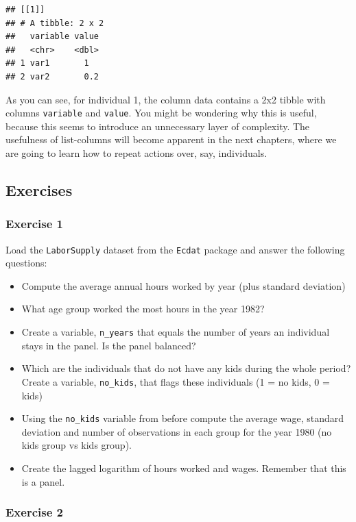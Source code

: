 \documentclass[]{gitbook}
\providecommand{\tightlist}{%
  \setlength{\itemsep}{0pt}\setlength{\parskip}{0pt}}
\theoremstyle{definition}
\theoremstyle{definition}
\theoremstyle{definition}
\theoremstyle{remark}
\begin{document}
\begin{verbatim}
## [[1]]
## # A tibble: 2 x 2
##   variable value
##   <chr>    <dbl>
## 1 var1       1  
## 2 var2       0.2
\end{verbatim}

As you can see, for individual 1, the column data contains a 2x2 tibble
with columns \texttt{variable} and \texttt{value}. You might be
wondering why this is useful, because this seems to introduce an
unnecessary layer of complexity. The usefulness of list-columns will
become apparent in the next chapters, where we are going to learn how to
repeat actions over, say, individuals.

\hypertarget{exercises-2}{%
\subsection{Exercises}\label{exercises-2}}

\hypertarget{exercise-1-2}{%
\subsubsection*{Exercise 1}\label{exercise-1-2}}

Load the \texttt{LaborSupply} dataset from the \texttt{Ecdat} package
and answer the following questions:

\begin{itemize}
\tightlist
\item
  Compute the average annual hours worked by year (plus standard
  deviation)
\item
  What age group worked the most hours in the year 1982?
\item
  Create a variable, \texttt{n\_years} that equals the number of years
  an individual stays in the panel. Is the panel balanced?
\item
  Which are the individuals that do not have any kids during the whole
  period? Create a variable, \texttt{no\_kids}, that flags these
  individuals (1 = no kids, 0 = kids)
\item
  Using the \texttt{no\_kids} variable from before compute the average
  wage, standard deviation and number of observations in each group for
  the year 1980 (no kids group vs kids group).
\item
  Create the lagged logarithm of hours worked and wages. Remember that
  this is a panel.
\end{itemize}

\hypertarget{exercise-2-1}{%
\subsubsection*{Exercise 2}\label{exercise-2-1}}
\end{document}

